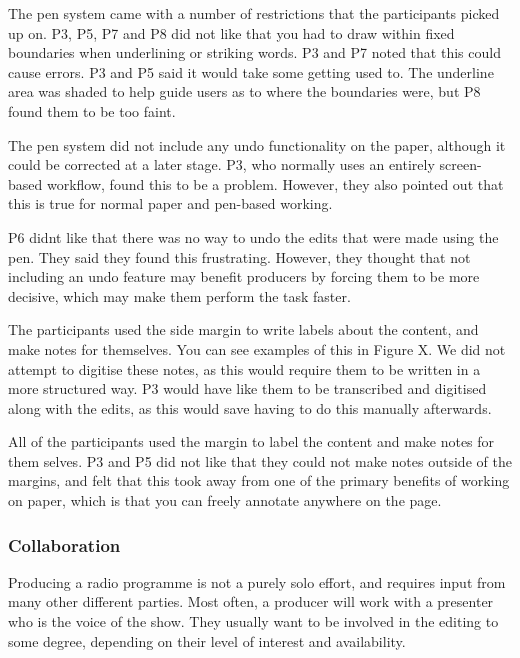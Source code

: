 

The pen system came with a number of restrictions that the participants picked up on. P3, P5, P7 and P8 did not like
that you had to draw within fixed boundaries when underlining or striking words. P3 and P7 noted that this could cause
errors. P3 and P5 said it would take some getting used to. The underline area was shaded to help guide users as to
where the boundaries were, but P8 found them to be too faint.


The pen system did not include any undo functionality on the paper, although it could be corrected at a later stage.
P3, who normally uses an entirely screen-based workflow, found this to be a problem. However, they also pointed out
that this is true for normal paper and pen-based working.

P6 didnt like that there was no way to undo the edits that were made using the pen. They said they found this
frustrating. However, they thought that not including an undo feature may benefit producers by forcing them to be more
decisive, which may make them perform the task faster.


The participants used the side margin to write labels about the content, and make notes for themselves. You can see
examples of this in Figure X. We did not attempt to digitise these notes, as this would require them to be written in a
more structured way. P3 would have like them to be transcribed and digitised along with the edits, as this would save
having to do this manually afterwards.

All of the participants used the margin to label the content and make notes for them selves. P3 and P5 did not like
that they could not make notes outside of the margins, and felt that this took away from one of the primary benefits of
working on paper, which is that you can freely annotate anywhere on the page.

\subsubsection{Collaboration}


Producing a radio programme is not a purely solo effort, and requires input from many other different parties. Most
often, a producer will work with a presenter who is the voice of the show. They usually want to be involved in the
editing to some degree, depending on their level of interest and availability.

